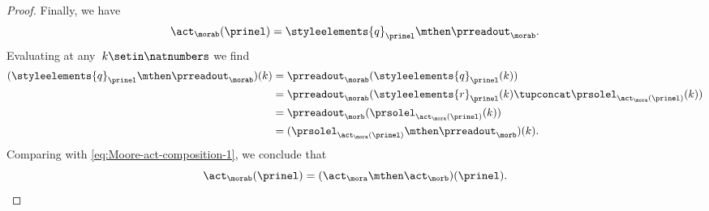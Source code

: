 \begin{proof}
    Finally, we have
    \begin{equation}
        \act_{\morab}(\prinel) = \styleelements{q}_\prinel \mthen \prreadout_{\morab}.
    \end{equation}
    Evaluating at any~$k \setin \natnumbers$ we find
    \begin{align}
        (\styleelements{q}_\prinel \mthen \prreadout_{\morab})(k)
         & = \prreadout_{\morab}(\styleelements{q}_\prinel(k)) \\
         & = \prreadout_{\morab}(\styleelements{r}_\prinel(k) \tupconcat \prsolel_{\act_\mora(\prinel)}(k)) \\
         & = \prreadout_{\morb}(\prsolel_{\act_\mora(\prinel)}(k)) \\
         & = (\prsolel_{\act_\mora(\prinel)} \mthen \prreadout_{\morb})(k).
    \end{align}
    Comparing with \cref{eq:Moore-act-composition-1}, we conclude that
    \begin{equation}
        \act_{\morab}(\prinel) = (\act_\mora \mthen \act_\morb)(\prinel).
    \end{equation}
\end{proof}


